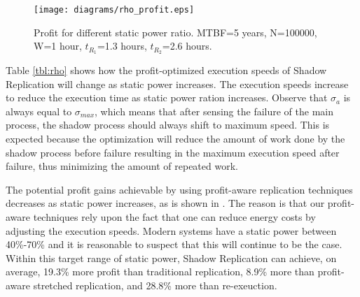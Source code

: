 \begin{figure}[!h]	
	\begin{center}
		\texttt{[image: diagrams/rho\_profit.eps]}
	\end{center}
	\caption{Profit for different static power ratio. MTBF=5 years, N=100000, W=1 hour, $t_{R_1}$=1.3 hours, $t_{R_2}$=2.6 hours.}
	\label{fig:rho}
\end{figure}

Table \ref{tbl:rho} shows how the profit-optimized execution speeds
of Shadow Replication will change as static power increases. The execution speeds increase to reduce the execution time as static power ration increases. Observe
that $\sigma_a$ is always equal to $\sigma_{max}$, which means that after
sensing the failure of the main process, the shadow process should always
shift to maximum speed. This is expected because the optimization will
reduce the amount of work done by the shadow process before failure
resulting in the maximum execution speed after failure, thus
minimizing the amount of repeated work. %

The potential profit gains achievable by using profit-aware
replication techniques decreases as static power increases, as is shown
in . The reason is that our profit-aware
techniques rely upon the fact that one can reduce energy costs by
adjusting the execution speeds. Modern systems have a static power between 40\%-70\% and
it is reasonable to suspect that this will continue to be the case. Within
this target range of static power, Shadow Replication can achieve, on
average, 19.3\% more profit than traditional replication, 8.9\% more
than profit-aware stretched replication, and 28.8\% more than re-exeuction.


